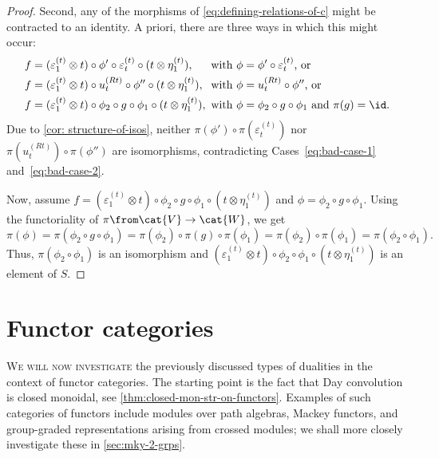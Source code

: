 \begin{proof}
  Second, any of the morphisms of \cref{eq:defining-relations-of-c} might be contracted to an identity.
  A priori, there are three ways in which this might occur:
  \begin{align}
    f&= (\varepsilon^{(t)}_1 \otimes t) \circ \phi' \circ \varepsilon^{(t)}_t \circ (t \otimes \eta^{(t)}_1),  &&\!\!\!\text{with } \phi=\phi' \circ \varepsilon^{(t)}_t \text{, or}\label{eq:bad-case-1}\\
    f&= (\varepsilon^{(t)}_1 \otimes t) \circ u^{(Rt)}_t \circ \phi'' \circ (t \otimes \eta^{(t)}_1), &&\!\!\!\text{with } \phi = u^{(Rt)}_t \circ \phi'' \text{, or}\label{eq:bad-case-2}\\
    f&= (\varepsilon^{(t)}_1 \otimes t) \circ \phi_2 \circ g \circ \phi_1 \circ (t \otimes \eta^{(t)}_1), &&\!\!\!\text{with } \phi=\phi_2 \circ g \circ \phi_1 \text{ and \(\pi(g)=\id\).}
  \end{align}
  Due to \cref{cor: structure-of-isos},
  neither \(\pi(\phi') \circ \pi(\varepsilon^{(t)}_{t})\) nor \(\pi(u^{(Rt)}_{t}) \circ \pi(\phi'')\) are isomorphisms,
  contradicting Cases~\eqref{eq:bad-case-1} and~\eqref{eq:bad-case-2}.

  Now, assume \(f = (\varepsilon^{(t)}_1\otimes t) \circ \phi_2 \circ g \circ \phi_1 \circ (t \otimes \eta^{(t)}_1)\) and \(\phi=\phi_2 \circ g \circ \phi_1\).
  Using the functoriality of \(\pi \from \cat{V} \to \cat{W}\), we get
  \[
    \pi(\phi)
    = \pi(\phi_2 \circ g \circ \phi_1)
    = \pi(\phi_2) \circ \pi(g) \circ \pi(\phi_1)
    = \pi(\phi_2) \circ \pi(\phi_1)
    = \pi(\phi_2 \circ \phi_1).
  \]
  Thus, \(\pi(\phi_2 \circ \phi_1)\) is an isomorphism
  and \((\varepsilon^{(t)}_1\otimes t) \circ \phi_2 \circ \phi_1 \circ (t \otimes \eta^{(t)}_1)\) is an element of \(S\).
\end{proof}

\section{Functor categories}\label{sec:tensor-rep-functor-cats}

\textsc{We will now investigate} the previously discussed types of dualities
in the context of functor categories.
The starting point is the fact that Day convolution is closed monoidal,
see \cref{thm:closed-mon-str-on-functors}.
Examples of such categories of functors
include modules over path algebras, Mackey functors, and
group-graded representations arising from crossed modules;
we shall more closely investigate these in \cref{sec:mky-2-grps}.

